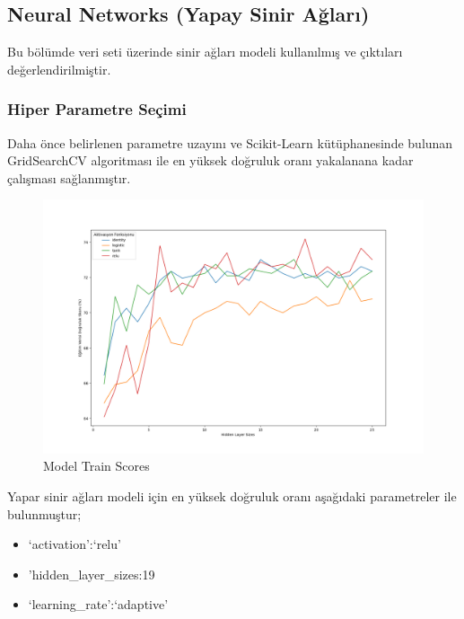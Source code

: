 \documentclass[12pt,twoside]{deuthesis}
\providecommand{\tightlist}{%
  \setlength{\itemsep}{0pt}\setlength{\parskip}{0pt}}
\begin{document}
\hypertarget{mult_nn}{%
\subsection{Neural Networks (Yapay Sinir Ağları)}\label{mult_nn}}

Bu bölümde veri seti üzerinde sinir ağları modeli kullanılmış ve çıktıları değerlendirilmiştir.

\hypertarget{hiper-parametre-seuxe7imi-3}{%
\subsubsection{Hiper Parametre Seçimi}\label{hiper-parametre-seuxe7imi-3}}

Daha önce belirlenen parametre uzayını ve Scikit-Learn kütüphanesinde bulunan GridSearchCV algoritması ile en yüksek doğruluk oranı yakalanana kadar çalışması sağlanmıştır.
\begin{figure}

{\centering \includegraphics[width=1.1\linewidth,height=0.5\textheight]{figure/NN_Grid_Graph} 

}

\caption{Model Train Scores}\label{fig:unnamed-chunk-38}
\end{figure}
Yapar sinir ağları modeli için en yüksek doğruluk oranı aşağıdaki parametreler ile bulunmuştur;
\begin{itemize}
\tightlist
\item
  `activation':`relu'
\item
  'hidden\_layer\_sizes:19
\item
  `learning\_rate':`adaptive'
\end{itemize}
\newpage
\end{document}
